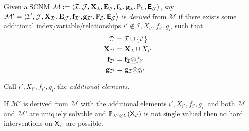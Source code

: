 \begin{definition}
Given a SCNM $\mathcal{M}:=\langle \mathcal{I},\mathcal{J},\mathbf{X}_{\mathcal{I}},\mathbf{E}_{\mathcal{J}},\mathbf{f}_{\mathcal{I}},\mathbf{g}_{\mathcal{I}},\mathbb{P}_{\mathcal{E}},\bm{\mathsf{E}}_{\mathcal{J}}\rangle$, say $\mathcal{M}'=\langle \mathcal{I}',\mathcal{J},\mathbf{X}_{\mathcal{I}'},\mathbf{E}_{\mathcal{J}},\mathbf{f}_{\mathcal{I}'},\mathbf{g}_{\mathcal{I}'},\mathbb{P}_{\mathcal{E}},\bm{\mathsf{E}}_{\mathcal{J}}\rangle$ is \emph{derived} from $\mathcal{M}$ if there exists some additional index/variable/relationships $i'\not\in\mathcal{I},X_{i'},f_{i'},g_{i'}$ such that
\begin{align}
	\mathcal{I}' &= \mathcal{I}\cup\{i'\}\\
	\mathbf{X}_{\mathcal{I}'} &= \mathbf{X}_{\mathcal{I}}\cup X_{i'}\\
	\mathbf{f}_{\mathcal{I}'} &= \mathbf{f}_{\mathcal{I}}\underline{\otimes} f_{i'}\\
	\mathbf{g}_{\mathcal{I}'} &= \mathbf{g}_{\mathcal{I}}\underline{\otimes} g_{i'}
\end{align}

Call $i',X_{i'},f_{i'},g_{i'}$ the \emph{additional elements}. 
\end{definition}

\begin{theorem}\label{th:no_interventions}
If $\mathcal{M}'$ is derived from $\mathcal{M}$ with the additional elements $i',X_{i'},f_{i'},g_{i'}$ and both $\mathcal{M}$ and $\mathcal{M}'$ are uniquely solvable and $\mathbb{P}_{\mathcal{X}'\otimes\mathcal{E}}(\mathsf{X}_{i'})$ is not single valued then no hard interventions on $\mathsf{X}_{i'}$ are possible.
\end{theorem}

